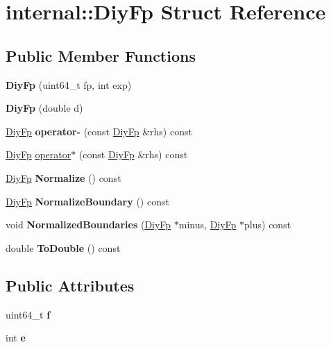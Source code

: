 \hypertarget{a02252}{}\section{internal\+:\+:Diy\+Fp Struct Reference}
\label{a02252}
\subsection*{Public Member Functions}
\begin{DoxyCompactItemize}
\item 
\mbox{\label{a02252_a9a8f2f5c49dfa0dee4a527f0829cc2e5}} 
{\bfseries Diy\+Fp} (uint64\+\_\+t fp, int exp)
\item 
\mbox{\label{a02252_adc132c7da4c8e3ee5ae12efdcf6dbf7c}} 
{\bfseries Diy\+Fp} (double d)
\item 
\mbox{\label{a02252_a9cea201daabec04c6f2526b35af8ead3}} 
\hyperlink{a02252}{Diy\+Fp} {\bfseries operator-\/} (const \hyperlink{a02252}{Diy\+Fp} \&rhs) const
\item 
\hyperlink{a02252}{Diy\+Fp} \hyperlink{a02252_a9868841f824924cc385ad5163c9c85b3}{operator$\ast$} (const \hyperlink{a02252}{Diy\+Fp} \&rhs) const
\item 
\mbox{\label{a02252_aa6cbacc8dfcd92cb8c57884e45548976}} 
\hyperlink{a02252}{Diy\+Fp} {\bfseries Normalize} () const
\item 
\mbox{\label{a02252_a3a840e739b412e20e11c05a03f4573df}} 
\hyperlink{a02252}{Diy\+Fp} {\bfseries Normalize\+Boundary} () const
\item 
\mbox{\label{a02252_adef8bf723f24db9dc6cefa260e8c2390}} 
void {\bfseries Normalized\+Boundaries} (\hyperlink{a02252}{Diy\+Fp} $\ast$minus, \hyperlink{a02252}{Diy\+Fp} $\ast$plus) const
\item 
\mbox{\label{a02252_acf0e7974f0a1175ae04edf8e4a7d1319}} 
double {\bfseries To\+Double} () const
\end{DoxyCompactItemize}
\subsection*{Public Attributes}
\begin{DoxyCompactItemize}
\item 
\mbox{\label{a02252_a09b9217a86e8a2e6aa8d2d48fc351008}} 
uint64\+\_\+t {\bfseries f}
\item 
\mbox{\label{a02252_afa9db335eeb61c7f966d888d89b1e6f2}} 
int {\bfseries e}
\end{DoxyCompactItemize}
